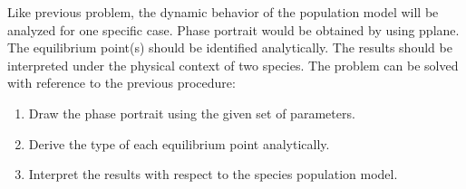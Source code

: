 Like previous problem, the dynamic behavior of the population model will be analyzed for one specific case. Phase portrait would be obtained by using pplane. The equilibrium point(s) should be identified analytically. The results should be interpreted under the physical context of two species. The problem can be solved with reference to the previous procedure:
\begin{enumerate}
\item Draw the phase portrait using the given set of parameters.
\item Derive the type of each equilibrium point analytically.
\item Interpret the results with respect to the species population model. 
\end{enumerate} 